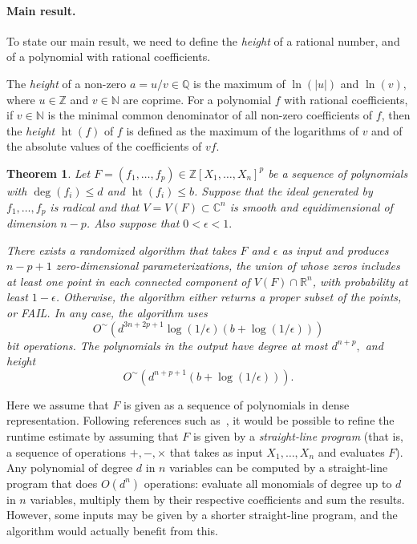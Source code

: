 \documentclass[12pt]{article}
\DeclareMathOperator{\htt}{ht}
\newcommand{\ZZ}{{\mathbb{Z}}}
\def\C{\mathbb{C}}
\def\Q{\mathbb{Q}}
\def\R{\mathbb{R}}
\newtheorem{theorem}{Theorem}[section]
\begin{document}
\paragraph*{Main result.} To state our main result, we need to define 
the {\em height} of a rational number, and of a polynomial with
rational coefficients.

The {\em height} of a non-zero $a=u/v \in \Q$ is the maximum of
$\ln(|u|)$ and $\ln(v),$ where $u \in \mathbb{Z}$ and $v \in
\mathbb{N}$ are coprime. For a polynomial $f$ with rational
coefficients, if $v \in \mathbb N$ is the minimal common denominator
of all non-zero coefficients of $f$, then the \textit{height}
$\htt(f)$ of $f$ is defined as the maximum of the logarithms of $v$
and of the absolute values of the coefficients of $vf$.

\begin{theorem}\label{theo:main}
  Let $F= (f_1,\hdots,f_p)\in\ZZ[X_1,\hdots,X_n]^p$ be a sequence of
  polynomials with $\deg(f_i) \leq d$ and $\htt(f_i) \leq b$. Suppose
  that the ideal generated by $f_1,\dots,f_p$ is radical and that
  $V=V(F) \subset \C^n$ is smooth and equidimensional of dimension
  $n-p$. Also suppose that $0 < \epsilon < 1.$ 

  There exists a randomized algorithm that takes $F$ and $\epsilon$ as
  input and produces $n-p+1$ zero-dimensional parameterizations, the union
  of whose zeros includes at least one point in each connected
  component of $V(F) \cap \R^n$, with probability at least
  $1-\epsilon$. Otherwise, the algorithm either returns a proper
  subset of the points, or FAIL.  In any case, the algorithm uses
  \[
  O^{\sim}(d^{3n+2p+1}\log(1/\epsilon)(b + \log(1/\epsilon)))
  \]
  bit operations. The polynomials in the output have degree at most
  $d^{n+p},$ and height
  \[
  O^{\sim}(d^{n+p+1}(b + \log(1/\epsilon))).
  \]
\end{theorem}

Here we assume that $F$ is given as a sequence of polynomials in dense
representation.  Following references such
as~\cite{GiHeMoPa95,GiHaHeMoMoPa97,GiHeMoMoPa98,BaGiHeMb97,EMP}, it
would be possible to refine the runtime estimate by assuming that $F$
is given by a {\em straight-line program} (that is, a sequence of
operations $+,-,\times$ that takes as input $X_1,\dots,X_n$ and
evaluates $F$). Any polynomial of degree $d$ in $n$ variables can be
computed by a straight-line program that does $O(d^n)$ operations:
evaluate all monomials of degree up to $d$ in $n$ variables, multiply
them by their respective coefficients and sum the results. However,
some inputs may be given by a shorter straight-line program, and the
algorithm would actually benefit from this.
\end{document}
